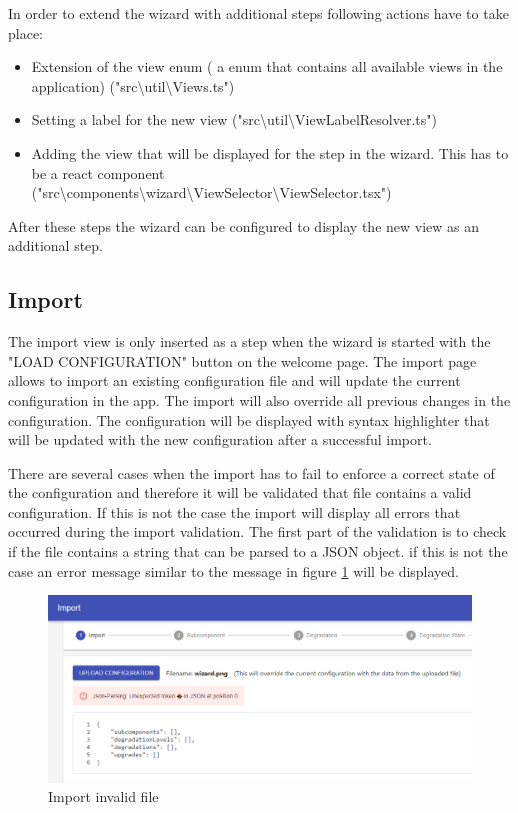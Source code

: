 \noindent In order to extend the wizard with additional steps following actions have to take place:

\begin{itemize}
    \item Extension of the view enum ( a enum that contains all available views in the application) ("src\textbackslash util\textbackslash Views.ts")
    \item Setting a label for the new view ("src\textbackslash util\textbackslash ViewLabelResolver.ts")
    \item Adding the view that will be displayed for the step in the wizard. This has to be a react component ("src\textbackslash components\textbackslash wizard\textbackslash ViewSelector\textbackslash ViewSelector.tsx")
\end{itemize}

\noindent After these steps the wizard can be configured to display the new view as an additional step.

\subsection{Import}
The import view is only inserted as a step when the wizard is started with the "LOAD CONFIGURATION" button on the welcome page. The import page allows to import an existing configuration file and will update the current configuration in the app. The import will also override all previous changes in the configuration. The configuration will be displayed with syntax highlighter that will be updated with the new configuration after a successful import. 

There are several cases when the import has to fail to enforce a correct state of the configuration and therefore it will be validated that file contains a valid configuration. If this is not the case the import will display all errors that occurred during the import validation. The first part of the validation is to check if the file contains a string that can be parsed to a JSON object. if this is not the case an error message similar to the message in figure \ref{fig:import_invalid_file} will be displayed.

\begin{figure}[ht]
    \centering
    \includegraphics[width=\textwidth]{img/import_invalid_file.png}
    \caption{Import invalid file}
    \label{fig:import_invalid_file}
\end{figure}

